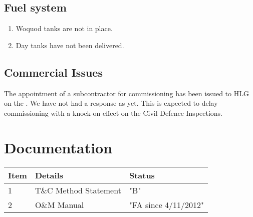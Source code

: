 \subsection{Fuel system}
\begin{enumerate}
\item Woquod tanks are not in place.
\item Day tanks have not been delivered.
\end{enumerate}

\subsection{Commercial Issues}

The appointment of a subcontractor for commissioning has been issued to HLG on the . We have not had a response as yet. This is expected to delay commissioning with a knock-on effect on the Civil Defence Inspections.

\section{Documentation}

\begin{tabular}{lll}
\toprule
Item & Details & Status\\
\midrule
1    & T\&C Method Statement & "B"\\
2    & O\&M Manual           & "FA since 4/11/2012" \\
\bottomrule
\end{tabular}
















